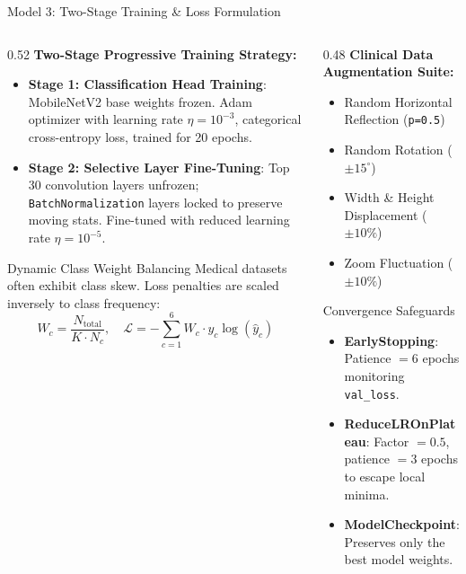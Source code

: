 \documentclass[aspectratio=169, 10pt]{beamer}
\begin{document}
\begin{frame}{Model 3: Two-Stage Training \& Loss Formulation}
\begin{columns}[T]
    \begin{column}{0.52\textwidth}
        \textbf{Two-Stage Progressive Training Strategy:}
        \begin{itemize}
            \item \textbf{Stage 1: Classification Head Training}:
            MobileNetV2 base weights frozen. Adam optimizer with learning rate $\eta = 10^{-3}$, categorical cross-entropy loss, trained for 20 epochs.
            \item \textbf{Stage 2: Selective Layer Fine-Tuning}:
            Top 30 convolution layers unfrozen; \texttt{BatchNormalization} layers locked to preserve moving stats. Fine-tuned with reduced learning rate $\eta = 10^{-5}$.
        \end{itemize}
        \begin{block}{Dynamic Class Weight Balancing}
            \scriptsize Medical datasets often exhibit class skew. Loss penalties are scaled inversely to class frequency:
            \begin{equation*}
                W_c = \frac{N_{\text{total}}}{K \cdot N_c}, \quad \mathcal{L} = -\sum_{c=1}^6 W_c \cdot y_c \log(\hat{y}_c)
            \end{equation*}
        \end{block}
    \end{column}
    \begin{column}{0.48\textwidth}
        \textbf{Clinical Data Augmentation Suite:}
        \begin{itemize}
            \item Random Horizontal Reflection (\texttt{p=0.5})
            \item Random Rotation ($\pm 15^\circ$)
            \item Width \& Height Displacement ($\pm 10\%$)
            \item Zoom Fluctuation ($\pm 10\%$)
        \end{itemize}
        \begin{exampleblock}{Convergence Safeguards}
            \scriptsize
            \begin{itemize}
                \item \textbf{EarlyStopping}: Patience $= 6$ epochs monitoring \texttt{val\_loss}.
                \item \textbf{ReduceLROnPlateau}: Factor $= 0.5$, patience $= 3$ epochs to escape local minima.
                \item \textbf{ModelCheckpoint}: Preserves only the best model weights.
            \end{itemize}
        \end{exampleblock}
    \end{column}
\end{columns}
\end{frame}
\end{document}
